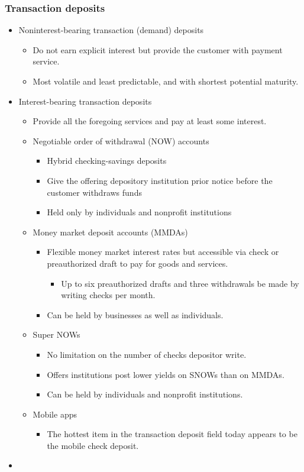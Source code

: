 \subsubsection{Transaction deposits}
\begin{itemize}
\item Noninterest-bearing transaction (demand) deposits
    \begin{itemize}
    \item Do not earn explicit interest but provide the customer with payment service.
    \item Most volatile and least predictable, and with shortest potential maturity.
    \end{itemize}
\item Interest-bearing transaction deposits
    \begin{itemize}
    \item Provide all the foregoing services and pay at least some interest.
    \item Negotiable order of withdrawal (NOW) accounts
        \begin{itemize}
        \item Hybrid checking-savings deposits
        \item Give the offering depository institution prior notice before the customer withdraws funds
        \item Held only by individuals and nonprofit institutions
        \end{itemize}
    \item Money market deposit accounts (MMDAs)
        \begin{itemize}
        \item Flexible money market interest rates but accessible via check or preauthorized draft to pay for goods and services.
            \begin{itemize}
            \item Up to six preauthorized drafts and three withdrawals be made by writing checks per month.
            \end{itemize}
        \item Can be held by businesses as well as individuals.
        \end{itemize}
    \item Super NOWs
        \begin{itemize}
        \item No limitation on the number of checks depositor write.
        \item Offers institutions post lower yields on SNOWs than on MMDAs.
        \item Can be held by individuals and nonprofit institutions.
        \end{itemize}
    \item Mobile apps
        \begin{itemize}
        \item The hottest item in the transaction deposit field today appears to be the mobile check deposit.
        \end{itemize}
    \end{itemize}
\item 
\end{itemize}
